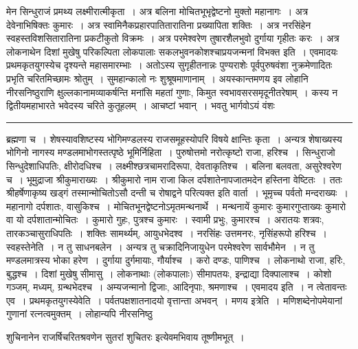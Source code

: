 \documentclass[11pt, openany]{book}
\begin{document}
\newpage

\noindent
मेन सिन्धुराजं प्रमथ्य लक्ष्मीरात्मीकृता~। अत्र बलिना मोचितभूभृद्वेष्टनो मुक्तो महानागः~। अत्र देवेनाभिषिक्तः कुमारः~। अत्र स्वामिनैकप्रहारपातितारातिना प्रख्यापिता शक्तिः~। अत्र नरसिंहेन स्वहस्तविशसितारातिना प्रकटीकुतो विक्रमः~। अत्र परमेश्वरेण तुषारशैलभुवो दुर्गाया गृहीतः करः~। अत्र लोकनाथेन दिशां मुखेषु परिकल्पिता लोकपालाः सकलभुवनकोशश्चाप्रयजन्मनां विभक्त इति~। एवमादयः प्रथमकृतयुगस्येच दृश्यन्ते महासमारम्भाः~। अतोऽस्य सुगृहीतनान्नः पुण्यराशेः पूर्वपुरुषवंशा नुक्रमेणादितः प्रभृति चरितमिच्छामः श्रोतुम्~। सुमहान्कालो नः शुश्रूषमाणानाम्~। अयस्कान्तमणय इव लोहानि नीरसनिष्ठुराणि क्षुल्लकानामव्याकर्षन्ति मनांसि महतां गुणाः, किमुत स्वभावसरसमृदूनीतरेषाम्~। कस्य न द्वितीयमहाभारते भवेदस्य चरिते कुतूहलम्~। आचष्टां भवान्~। भवतु भार्गवोऽयं वंशः

\vspace{2mm}
\hrule

\noindent
{\s ब्रह्मणा च~। शेषस्यावशिष्टस्य भोगिमण्डलस्य राजसमूहस्योपरि विषये क्षान्तिः कृता~। अन्यत्र शेषाख्यस्य भोगिनो नागस्य मण्डलमाभोगस्तत्पृष्ठे भूमिर्निहिता~। पुरुषोत्तमो नरोत्कृष्टो राजा, हरिश्च~। सिन्धुराजो सिन्धुदेशाधिपतिः, क्षीरोदधिश्च~। लक्ष्मीश्छत्रचामरादिरूपा, देवताकृतिश्च~। बलिना बलवता, असुरेश्वरेण च~। भूमुद्राजा श्रीकुमाराख्यः~। श्रीकुमारो नाम राजा किल दर्पशातेनापजातमदेन हस्तिना वेष्टितः~। ततः श्रीहर्षेणाकृष्य खड्गं तस्मान्मोचितोऽसौ दन्ती च रोषाद्वने परित्यक्त इति वार्ता~। भूमृच्च पर्वतो मन्दराख्यः~। महानागो दर्पशातः, वासुकिश्च~। मोचितभूनद्वेष्टनोऽमृतमन्थनार्थे~। मन्थनायें कुमारः कुमारगुप्ताख्यः कुमारो वा यो दर्पशातान्मोचितः~। कुमारो गुहः, पुत्रश्च कुमारः~। स्वामी प्रभुः, कुमारश्च~। अरातयः शत्रवः, तारकञ्चासुराधिपतिः~। शक्तिः सामर्थ्यम्, आयुधभेदश्व~। नरसिंहः उत्तमनरः, नृसिंहरूपो हरिश्च~। {\qtt स्वहस्तेनेति}~। न तु साधनबलेन~। अन्यत्र तु चक्रादिनिजायुधेन परमेश्वरेण सार्वभौमेन~। न तु मण्डलमात्रस्य भोका हरेण~। दुर्गाया दुर्गमायाः, गौर्याश्च~। करो दण्डः, पाणिश्च~। लोकनाथो राजा, हरिः, बुद्धश्च~। दिशां मुखेषु सीमासु~। लोकनाथाः (लोकपालाः) सीमापतयः, इन्द्राद्या दिक्पालाश्च~। कोशो गञ्जम्, मध्यम्, ग्रन्थभेदश्च~। अम्यजन्मानो द्विजाः, आदिनृपाः, श्रमणाश्च~। {\qtt एवमादय इति}~। न त्वेतावन्तः एव~। {\qtt प्रथमकृतयुगस्येवेति}~। पर्वतपक्षशातनादयो वृत्तान्ता अभवन्~। {\qtt मणय इत्रेति}~। मणिशब्देनोपमेयानां गुणानां रत्नत्वमुक्तम्~। लोहान्यपि नीरसनिष्ठु\textendash}

\newpage

\noindent
शुचिनानेन राजर्षिचरितश्रवणेन सुतरां शुचितरः इत्येवमभिवाय तूष्णीमभूत्~।
\end{document}
